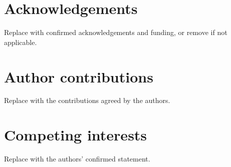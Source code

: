 \documentclass[11pt]{article}
\begin{document}



\section*{Acknowledgements}
Replace with confirmed acknowledgements and funding, or remove if not applicable.
\section*{Author contributions}
Replace with the contributions agreed by the authors.
\section*{Competing interests}
Replace with the authors' confirmed statement.
\end{document}
